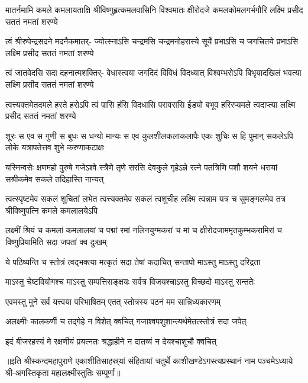


\fourlineindentedshloka
{मातर्नमामि कमले कमलायताक्षि}
{श्रीविष्णुहृत्कमलवासिनि विश्वमातः}
{क्षीरोदजे कमलकोमलगर्भगौरि}
{लक्ष्मि प्रसीद सततं नमतां शरण्ये}%

\fourlineindentedshloka
{त्वं श्रीरुपेन्द्रसदने मदनैकमातर्-}
{ज्योत्स्नाऽसि चन्द्रमसि चन्द्रमनोहरास्ये}
{सूर्ये प्रभाऽसि च जगत्त्रितये प्रभाऽसि}
{लक्ष्मि प्रसीद सततं नमतां शरण्ये}%


\fourlineindentedshloka
{त्वं जातवेदसि सदा दहनात्मशक्तिर्-}
{वेधास्त्वया जगदिदं विविधं विदध्यात्}
{विश्वम्भरोऽपि बिभृयादखिलं भवत्या}
{लक्ष्मि प्रसीद सततं नमतां शरण्ये}%

\fourlineindentedshloka
{त्वत्त्यक्तमेतदमले हरते हरोऽपि}
{त्वं पासि हंसि विदधासि परावरासि}
{ईड्यो बभूव हरिरप्यमले त्वदाप्त्या}
{लक्ष्मि प्रसीद सततं नमतां शरण्ये}%

\fourlineindentedshloka
{शूरः स एव स गुणी स बुधः स धन्यो}
{मान्यः स एव कुलशीलकलाकलापैः}
{एकः शुचिः स हि पुमान् सकलेऽपि लोके}
{यत्रापतेत्तव शुभे करुणाकटाक्षः}%

\fourlineindentedshloka
{यस्मिन्वसेः क्षणमहो पुरुषे गजेऽश्वे}
{स्त्रैणे तृणे सरसि देवकुले गृहेऽन्ने}
{रत्ने पतत्रिणि पशौ शयने धरायां}
{सश्रीकमेव सकले तदिहास्ति नान्यत्}%

\fourlineindentedshloka
{त्वत्स्पृष्टमेव सकलं शुचितां लभेत}
{त्वत्त्यक्तमेव सकलं त्वशुचीह लक्ष्मि}
{त्वन्नाम यत्र च सुमङ्गलमेव तत्र}
{श्रीविष्णुपत्नि कमले कमलालयेऽपि}%

\fourlineindentedshloka
{लक्ष्मीं श्रियं च कमलां कमलालयां च}
{पद्मां रमां नलिनयुग्मकरां च मां च}
{क्षीरोदजाममृतकुम्भकरामिरां च}
{विष्णुप्रियामिति सदा जपतां क्व दुःखम्}%

\twolineshloka
{ये पठिष्यन्ति च स्तोत्रं त्वद्भक्त्या मत्कृतं सदा}
{तेषां कदाचित् सन्तापो माऽस्तु माऽस्तु दरिद्रता}%

\twolineshloka
{माऽस्तु चेष्टवियोगश्च माऽस्तु सम्पत्तिसङ्क्षयः}
{सर्वत्र विजयश्चाऽस्तु विच्छदो माऽस्तु सन्ततेः}%


\twolineshloka
{एवमस्तु मुने सर्वं यत्त्वया परिभाषितम्}
{एतत् स्तोत्रस्य पठनं मम सान्निध्यकारणम्}%

\twolineshloka
{अलक्ष्मीः कालकर्णी च तद्गेहे न विशेत् क्वचित्}
{गजाश्वपशुशान्त्यर्थमेतत्स्तोत्रं सदा जपेत्}%

\twolineshloka
{इदं बीजरहस्यं मे रक्षणीयं प्रयत्नतः}
{श्रद्धाहीने न दातव्यं न देयश्चाशुचौ क्वचित्}%

॥इति श्रीस्कन्दमहापुराणे एकाशीतिसाहस्र्यां संहितायां चतुर्थे काशीखण्डेऽगस्त्यप्रस्थानं नाम पञ्चमेऽध्याये श्री-अगस्तिकृता महालक्ष्मीस्तुतिः सम्पूर्णा॥

